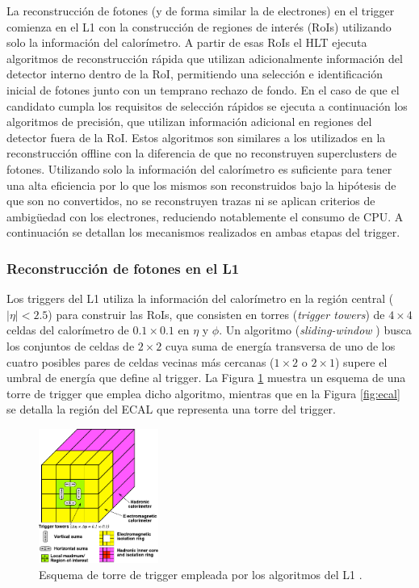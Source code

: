 La reconstrucción de fotones \cite{TRIG-2018-05} (y de forma similar la de electrones) en el trigger comienza en el L1 con la construcción de regiones de interés (RoIs) utilizando solo la información del calorímetro. A partir de esas RoIs el HLT ejecuta algoritmos de reconstrucción rápida que utilizan adicionalmente información del detector interno dentro de la RoI, permitiendo una selección e identificación inicial de fotones junto con un temprano rechazo de fondo. En el caso de que el candidato cumpla los requisitos de selección rápidos se ejecuta a continuación los algoritmos de precisión, que utilizan información adicional en regiones del detector fuera de la RoI. Estos algoritmos son similares a los utilizados en la reconstrucción offline con la diferencia de que no reconstruyen superclusters de fotones. Utilizando solo la información del calorímetro es suficiente para tener una alta eficiencia por lo que los mismos son reconstruidos bajo la hipótesis de que son no convertidos, no se reconstruyen trazas ni se aplican criterios de ambigüedad con los electrones, reduciendo notablemente el consumo de CPU. 
A continuación se detallan los mecanismos realizados en ambas etapas del trigger.

\subsubsection{Reconstrucción de fotones en el L1}

Los triggers del L1 utiliza la información del calorímetro en la región central ($|\eta|<2.5$) para construir las RoIs, que consisten en torres (\textit{trigger towers}) de $4\times4$ celdas del calorímetro de $0.1\times0.1$ en $\eta$ y $\phi$. Un algoritmo (\textit{sliding-window} \cite{Lampl:1099735}) busca los conjuntos de celdas de $2\times2$ cuya suma de energía transversa de uno de los cuatro posibles pares de celdas vecinas más cercanas ($1\times2$ o $2\times1$) supere el umbral de energía que define al trigger. La Figura \ref{fig:l1_reco} muestra un esquema de una torre de trigger que emplea dicho algoritmo, mientras que en la Figura \ref{fig:ecal} se detalla la región del ECAL que representa una torre del trigger.

\begin{figure}
  \centering
  \includegraphics[width=0.35\textwidth]{images/trigger/l1_reco.pdf}
  \caption{Esquema de torre de trigger empleada por los algoritmos del L1 \cite{TRIG-2016-01}.}
  \label{fig:l1_reco}
\end{figure}


